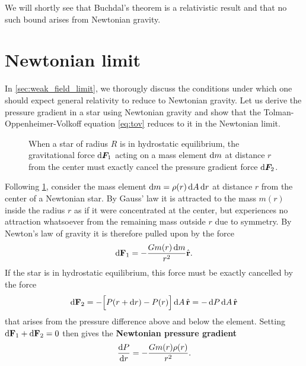 We will shortly see that Buchdal's theorem is a relativistic result and that no such bound arises from Newtonian gravity.

\section{Newtonian limit}

In \cref{sec:weak_field_limit}, we thorougly discuss the conditions under which one should expect general relativity to reduce to Newtonian gravity.
Let us derive the pressure gradient in a star using Newtonian gravity and show that the Tolman-Oppenheimer-Volkoff equation \eqref{eq:tov} reduces to it in the Newtonian limit.

\begin{figure}
\centering
{}
\caption{\label{fig:hydrostatic_equilibrium_sphere}When a star of radius $R$ is in hydrostatic equilibrium, the gravitational force $\mathop{}\!\mathrm{d} {\bm{F}}_1$ acting on a mass element  $\mathop{}\!\mathrm{d} m$ at distance $r$ from the center must exactly cancel the pressure gradient force $\mathop{}\!\mathrm{d} {\bm{F}}_2$.}
\end{figure}

Following \cref{fig:hydrostatic_equilibrium_sphere}, consider the mass element $\mathop{}\!\mathrm{d} m = \rho(r) \mathop{}\!\mathrm{d} A \mathop{}\!\mathrm{d} r$ at distance $r$ from the center of a Newtonian star.
By Gauss' law it is attracted to the mass $m(r)$ inside the radius $r$ as if it were concentrated at the center, but experiences no attraction whatsoever from the remaining mass outside $r$ due to symmetry.
By Newton's law of gravity it is therefore pulled upon by the force
\begin{equation}
	\mathop{}\!\mathrm{d} \mathbf{F}_1 = -\frac{G m(r) \mathop{}\!\mathrm{d} m}{r^2} \hat{\textbf{r}} .
	\label{eq:weak_field_limit:force_newton}
\end{equation}
If the star is in hydrostatic equilibrium, this force must be exactly cancelled by the force
\begin{equation}
	\mathop{}\!\mathrm{d} \textbf{F}_2 = - \Big[ P(r + \mathop{}\!\mathrm{d} r) - P(r) \Big] \mathop{}\!\mathrm{d} A \, \hat{\textbf{r}} = -\mathop{}\!\mathrm{d} P \mathop{}\!\mathrm{d} A \, \hat{\textbf{r}}
	\label{eq:weak_field_limit:force_pressure}
\end{equation}
that arises from the pressure difference above and below the element.
Setting $\mathop{}\!\mathrm{d} \textbf{F}_1 + \mathop{}\!\mathrm{d} \textbf{F}_2 = 0$ then gives the \textbf{Newtonian pressure gradient}
\begin{equation}
	\odv{P}{r} = -\frac{G m(r) \rho(r)}{r^2} .
	\label{eq:weak_field_limit:newtonian_pressure_gradient}
\end{equation}

